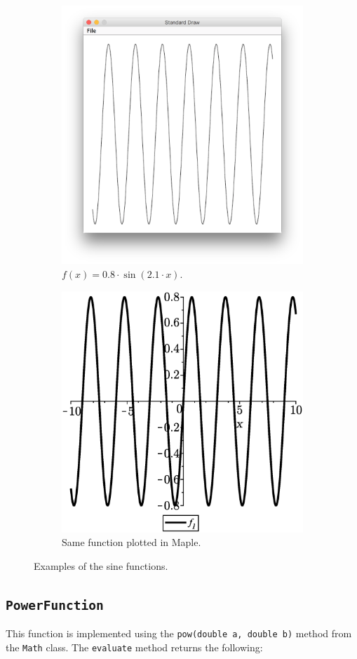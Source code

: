 \begin{figure}[H]
    \begin{subfigure}{0.5\textwidth}
        \centering
    \includegraphics[width=0.7\linewidth]{GraphicalFunctionPlotter/fig/f1.png} 
    \caption{$f(x)=0.8\cdot \sin(2.1\cdot x)$.}
    \label{fig:f1}
    \end{subfigure}
    \begin{subfigure}{0.5\textwidth}
        \centering
    \includegraphics[width=0.7\linewidth]{GraphicalFunctionPlotter/fig/f1Check.eps}
    \caption{Same function plotted in Maple.}
    \label{fig:f1Check}
    \end{subfigure}
    \caption{Examples of the sine functions.}
\end{figure}
\newpage
\subsection{\texttt{PowerFunction}}
This function is implemented using the \texttt{pow(double a, double b)} method from the \texttt{Math} class. The \texttt{evaluate} method returns the following: 

